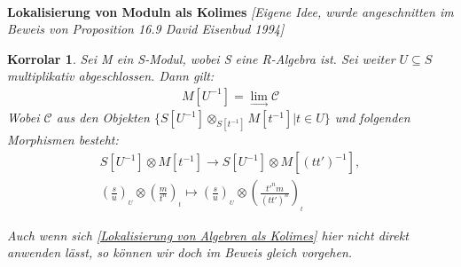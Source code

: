 \documentclass[10pt,a4paper]{report}
\newcommand{\comment}[1]{}
\newcommand{\ModulsOfDifferenzials}{David Eisenbud 1994}
\newcounter{Aussage}[chapter]
\newtheorem{korrolar}[Aussage]{Korrolar}
\newcommand{\Tensor}[3]{#1 \otimes_{#2} #3}
\newcommand{\tensor}[3]{#1 \otimes #3}
\newcommand{\lok}[2]{#1 [#2^{-1}]}
\newcommand{\loke}[3]{(\frac{#1}{#2})_{_{#3}}}
\newcommand{\colimes}[0]{\lim\limits_{ \longrightarrow }}
\begin{document}
\ \\
\textbf{Lokalisierung von Moduln als Kolimes} \textit{[Eigene Idee, wurde angeschnitten im Beweis von Proposition 16.9 \ModulsOfDifferenzials]}
\begin{korrolar}\comment{\label{Lokalisierung von Moduln als Kolimes}}
Sei M ein S-Modul, wobei S eine R-Algebra ist. Sei weiter $U \subseteq S$ multiplikativ abgeschlossen. Dann gilt:
\begin{gather*}
\lok{M}{U} = \colimes \mathcal{C}
\end{gather*}
Wobei $\mathcal{C}$ aus den Objekten $\lbrace \Tensor{\lok{S}{U}}{\lok{S}{t}}{\lok{M}{t}} \vert t \in U \rbrace$ und folgenden Morphismen besteht:
\begin{gather*}
\tensor{\lok{S}{U}}{\lok{S}{t}}{\lok{M}{t}} \longrightarrow
\tensor{\lok{S}{U}}{\lok{S}{(tt')}}{\lok{M}{(tt')}} ,\\
\tensor{\loke{s}{u}{U}}{\lok{S}{t}}{\loke{m}{t^n}{t}} \longmapsto
\tensor{\loke{s}{u}{U}}{\lok{S}{t}}{\loke{t'^nm}{(tt')^n}{t}} 
\end{gather*}
\end{korrolar}
\textit{Auch wenn sich \cref{Lokalisierung von Algebren als Kolimes} hier nicht direkt anwenden lässt, so können wir doch im Beweis gleich vorgehen.}
\end{document}
